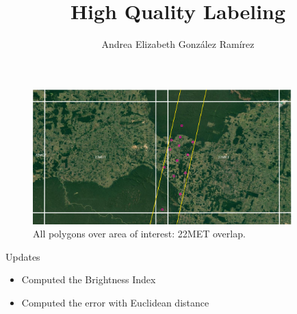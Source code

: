 \documentclass{beamer}
\title{High Quality Labeling}
\author{Andrea Elizabeth González Ramírez}
\begin{document}
\begin{frame}
    \titlepage
    \thispagestyle{empty}
\end{frame}

\section{}
\begin{frame}
    \begin{figure}
        \includegraphics[width=10cm]{Figures/v3/main/overlaping_polygons_1.png}
        \caption{All polygons over area of interest: 22MET overlap.}  
        \centering
    \end{figure}
\end{frame}

\begin{frame}{Updates}
    \begin{itemize}
        \item Computed the Brightness Index
        \item Computed the error with Euclidean distance
    \end{itemize}
\end{frame}
\end{document}
